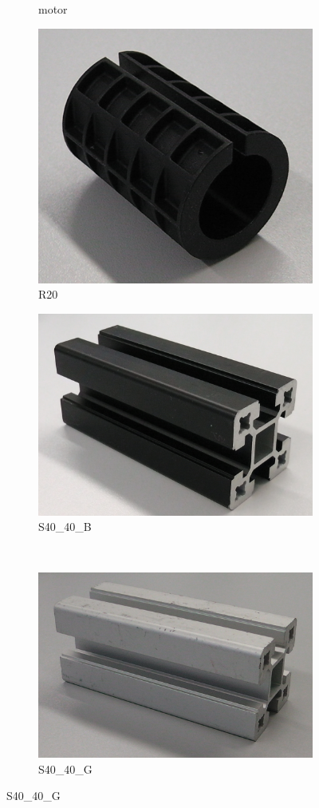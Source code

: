 \begin{figure}
\begin{subfigure}{.3\textwidth}
  			\caption{motor \cite{github_robocup@work}}
  			\label{fig:motor}
		\end{subfigure}
		\begin{subfigure}{.3\textwidth}
  			\centering
  			\includegraphics[width=.5\linewidth]{images/R20}
  			\caption{R20 \cite{github_robocup@work}}
  			\label{fig:R20}
		\end{subfigure}
		\begin{subfigure}{.3\textwidth}
  			\centering
  			\includegraphics[width=.5\linewidth]{images/S40_40_B}
  			\caption{S40\_40\_B \cite{github_robocup@work}}
  			\label{fig:S40_40_B}
		\end{subfigure}\\
		\vspace{3mm}
		\begin{subfigure}{.3\textwidth}
  			\centering
  			\includegraphics[width=.5\linewidth]{images/S40_40_G}
  			\caption{S40\_40\_G \cite{github_robocup@work}}
  			\label{fig:S40_40_G}
		\end{subfigure}

\end{figure}
